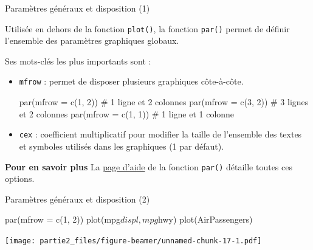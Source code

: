 \documentclass[12pt,ignorenonframetext,]{beamer}
\newenvironment{Shaded}{}{}
\newcommand{\KeywordTok}[1]{\textcolor[rgb]{0.00,0.00,1.00}{#1}}
\newcommand{\DataTypeTok}[1]{#1}
\newcommand{\DecValTok}[1]{#1}
\newcommand{\CommentTok}[1]{\textcolor[rgb]{0.00,0.50,0.00}{#1}}
\newcommand{\OperatorTok}[1]{#1}
\newcommand{\NormalTok}[1]{#1}
\renewenvironment{Shaded}{\begin{snugshade}}{\end{snugshade}}
\begin{document}
\begin{frame}[fragile]{Paramètres généraux et disposition (1)}

Utilisée en dehors de la fonction \texttt{plot()}, la fonction
\texttt{par()} permet de définir l'ensemble des paramètres graphiques
globaux.

\pause Ses mots-clés les plus importants sont :

\begin{itemize}
\item
  \texttt{mfrow} : permet de disposer plusieurs graphiques côte-à-côte.

\begin{Shaded}
\begin{Highlighting}[]
\KeywordTok{par}\NormalTok{(}\DataTypeTok{mfrow =} \KeywordTok{c}\NormalTok{(}\DecValTok{1}\NormalTok{, }\DecValTok{2}\NormalTok{)) }\CommentTok{# 1 ligne et 2 colonnes}
\KeywordTok{par}\NormalTok{(}\DataTypeTok{mfrow =} \KeywordTok{c}\NormalTok{(}\DecValTok{3}\NormalTok{, }\DecValTok{2}\NormalTok{)) }\CommentTok{# 3 lignes et 2 colonnes}
\KeywordTok{par}\NormalTok{(}\DataTypeTok{mfrow =} \KeywordTok{c}\NormalTok{(}\DecValTok{1}\NormalTok{, }\DecValTok{1}\NormalTok{)) }\CommentTok{# 1 ligne et 1 colonne}
\end{Highlighting}
\end{Shaded}
\item
  \texttt{cex} : coefficient multiplicatif pour modifier la taille de
  l'ensemble des textes et symboles utilisés dans les graphiques (1 par
  défaut).
\end{itemize}

\pause 

\textbf{Pour en savoir plus} La
\href{http://stat.ethz.ch/R-manual/R-devel/library/graphics/html/par.html}{page
d'aide} de la fonction \texttt{par()} détaille toutes ces options.

\end{frame}

\begin{frame}[fragile]{Paramètres généraux et disposition (2)}

\begin{Shaded}
\begin{Highlighting}[]
\KeywordTok{par}\NormalTok{(}\DataTypeTok{mfrow =} \KeywordTok{c}\NormalTok{(}\DecValTok{1}\NormalTok{, }\DecValTok{2}\NormalTok{))}
\KeywordTok{plot}\NormalTok{(mpg}\OperatorTok{$}\NormalTok{displ, mpg}\OperatorTok{$}\NormalTok{hwy)}
\KeywordTok{plot}\NormalTok{(AirPassengers)}
\end{Highlighting}
\end{Shaded}

\texttt{[image: partie2\_files/figure-beamer/unnamed-chunk-17-1.pdf]}

\end{frame}
\end{document}
